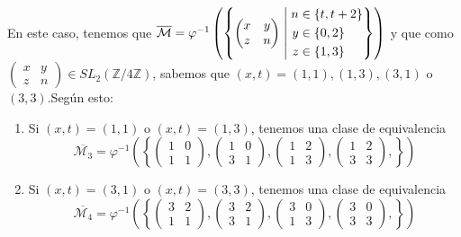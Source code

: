 \documentclass{article}
\newcommand{\suchthat}{\;\ifnum\currentgrouptype=16 \middle\fi|\;}
\begin{document}
\begin{enumerate}
		En este caso, tenemos que 
		$
		\overline{\mathcal{M}} =
		\varphi^{-1}\left( 
		\left\{
		\begin{pmatrix}
		x & y \\
		z & n
		\end{pmatrix}
		\suchthat
		\begin{aligned}
		n &\in \{t, t+2\} \\
		y &\in \{0, 2\} \\
		z &\in \{1, 3\} 
		\end{aligned}
		\right\}	
		\right)$ y que como 
		$ \begin{pmatrix}
		x & y \\
		z & n 
		\end{pmatrix} 
		\in SL_2(\mathbb{Z}/ 4\mathbb{Z}) $, sabemos que $(x, t) = (1,1), (1,3), (3,1) $ o $ (3,3)$.\newline Según esto:
		\begin{enumerate}
			\item Si $(x,t) = (1,1)$ o $(x,t) = (1,3)$, tenemos una clase de equivalencia 
			$$
			\overline{\mathcal{M}_{3}} = 
			\varphi^{-1}\left( 
			\left\{
			\begin{pmatrix}
			1 & 0 \\
			1 & 1 
			\end{pmatrix},
			\begin{pmatrix}
			1 & 0 \\
			3 & 1 
			\end{pmatrix},
			\begin{pmatrix}
			1 & 2 \\
			1 & 3 
			\end{pmatrix},
			\begin{pmatrix}
			1 & 2 \\
			3 & 3 
			\end{pmatrix},
			\right\}	
			\right) $$
			\item Si $(x,t) = (3,1)$ o $(x,t) = (3,3)$, tenemos una clase de equivalencia 
			$$
			\overline{\mathcal{M}_{4}} = 
			\varphi^{-1}\left( 
			\left\{
			\begin{pmatrix}
			3 & 2 \\
			1 & 1 
			\end{pmatrix},
			\begin{pmatrix}
			3 & 2 \\
			3 & 1 
			\end{pmatrix},
			\begin{pmatrix}
			3 & 0 \\
			1 & 3 
			\end{pmatrix},
			\begin{pmatrix}
			3 & 0 \\
			3 & 3 
			\end{pmatrix},
			\right\}	
			\right) $$
		\end{enumerate}
	

\end{enumerate}
\end{document}
